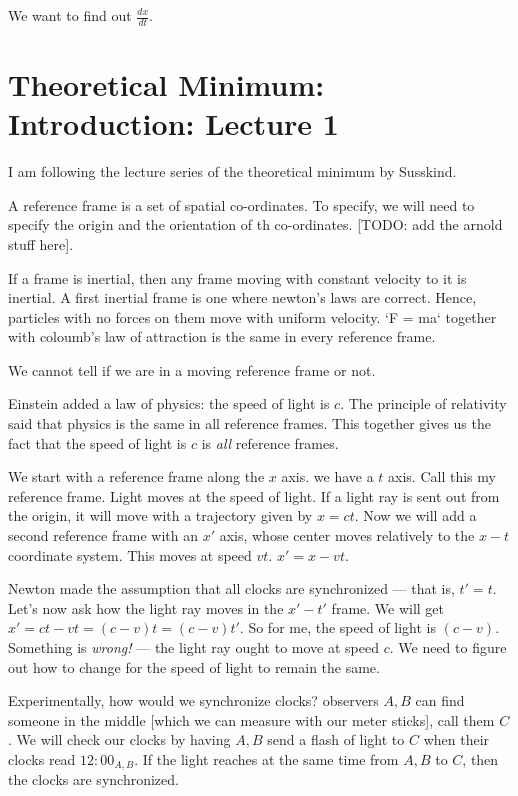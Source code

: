 \documentclass[11pt]{book}
\begin{document}
We want to find out $\frac{dx}{dt}$.


\chapter{Theoretical Minimum: Introduction: Lecture 1}

I am following the lecture series of the theoretical minimum by Susskind.

A reference frame is a set of spatial co-ordinates. To specify, we will need
to specify the origin and the orientation of th co-ordinates.
[TODO: add the arnold stuff here].

If a frame is inertial, then any frame moving with constant velocity to it
is inertial. A first inertial frame is one where newton's laws are correct.
Hence, particles with no forces on them move with uniform velocity.
`F = ma` together with coloumb's law of attraction is the same in every
reference frame.

We cannot tell if we are in a moving reference frame or not.

Einstein added a law of physics: the speed of light is $c$. The principle of
relativity said that physics is the same in all reference frames. This
together gives us the fact that the speed of light is $c$ is \emph{all}
reference frames.

We start with a reference frame along the $x$ axis. we have a $t$ axis. Call
this my reference frame. Light moves at the speed of light. If a light
ray is sent out from the origin, it will move with a trajectory given
by $x = ct$. Now we will add a second reference frame with an $x'$ axis,
whose center moves relatively to the $x-t$ coordinate system. This
moves at speed $vt$. $x' = x - vt$.

Newton made the assumption that all clocks are synchronized --- that is,
$t' = t$. Let's now ask how the light ray moves in the $x'-t'$ frame.
We will get $x' = ct - vt = (c - v)t = (c - v)t'$. So for me, the
speed of light is $(c - v)$. Something is \emph{wrong!} --- the light ray
ought to move at speed $c$. We need to figure out how to change for the
speed of light to remain the same.

Experimentally, how would we synchronize clocks? observers $A, B$ can
find someone in the middle [which we can measure with our meter sticks],
call them $C$. We will check our clocks by having $A, B$ send a flash of light
to $C$ when their clocks read $12:00_{A, B}$. If the light reaches at the same
time from $A, B$ to $C$, then the clocks are synchronized.
\end{document}

